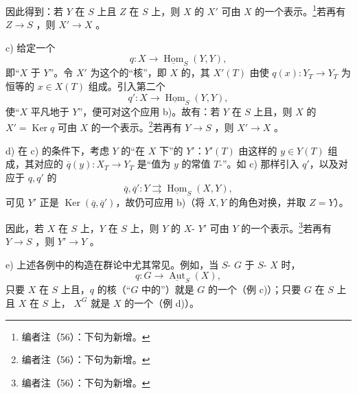 因此得到：若 $Y$ 在 $S$ 上且 $Z$ 在 $S$ 上，则 $X$ 的 $X'$ 可由 $X$ 的一个表示。\footnote{编者注（56）：下句为新增。}若再有 $Z\to S$ ，则 $X'\to X$ 。

c) 给定一个
\[
q:X\longrightarrow\underline{\operatorname{Hom}}_S(Y,Y),
\]
即“$X$ 于 $Y$”。令 $X'$ 为这个的“核”，即 $X$ 的，其 $X'(T)$ 由使 $q(x):Y_T\to Y_T$ 为恒等的 $x\in X(T)$ 组成。引入第二个
\[
q':X\longrightarrow\underline{\operatorname{Hom}}_S(Y,Y),
\]
使“$X$ 平凡地于 $Y$”，便可对这个应用 b)。故有：若 $Y$ 在 $S$ 上且，则 $X$ 的 $X'=\operatorname{Ker}q$ 可由 $X$ 的一个表示。\footnote{编者注（56）：下句为新增。}若再有 $Y\to S$ ，则 $X'\to X$ 。

d) 在 c) 的条件下，考虑 $Y$ 的“在 $X$ 下”的 $Y'$：$Y'(T)$ 由这样的 $y\in Y(T)$ 组成，其对应的 $\overline q(y):X_T\to Y_T$ 是“值为 $y$ 的常值 $T$-”。如 c) 那样引入 $q'$，以及对应于 $q,q'$ 的
\[
\overline q,\overline q':Y\rightrightarrows\underline{\operatorname{Hom}}_S(X,Y),
\]
可见 $Y'$ 正是 $\operatorname{Ker}(\overline q,\overline q')$，故仍可应用 b)（将 $X,Y$ 的角色对换，并取 $Z=Y$）。

因此，若 $X$ 在 $S$ 上，$Y$ 在 $S$ 上，则 $Y$ 的 $X$- $Y'$ 可由 $Y$ 的一个表示。\footnote{编者注（56）：下句为新增。}若再有 $Y\to S$ ，则 $Y'\to Y$ 。

e) 上述各例中的构造在群论中尤其常见。例如，当 $S$- $G$ 于 $S$- $X$ 时，
\[
q:G\longrightarrow\underline{\operatorname{Aut}}_S(X),
\]
只要 $X$ 在 $S$ 上且，$q$ 的核（“$G$ 中的”）就是 $G$ 的一个（例 c)）；只要 $G$ 在 $S$ 上且 $X$ 在 $S$ 上， $X^G$ 就是 $X$ 的一个（例 d)）。

